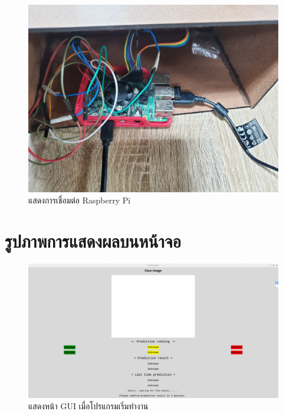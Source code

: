 \begin{figure}[!ht]
  \begin{center}
    \includegraphics[scale=.17]{pic/rpi.jpg}
    \caption[Raspberry Pi]{แสดงการเชื่อมต่อ Raspberry Pi}
    \label{fig:rpi_module}
  \end{center}
\end{figure}

\newpage
\section{รูปภาพการแสดงผลบนหน้าจอ}

\begin{figure}[!ht]
    \begin{center}
      \includegraphics[scale=.35]{pic/main_page.png}
      \caption[main page]{แสดงหน้า GUI เมื่อโปรแกรมเริ่มทำงาน}
      \label{fig:main_page}
    \end{center}
  \end{figure}




